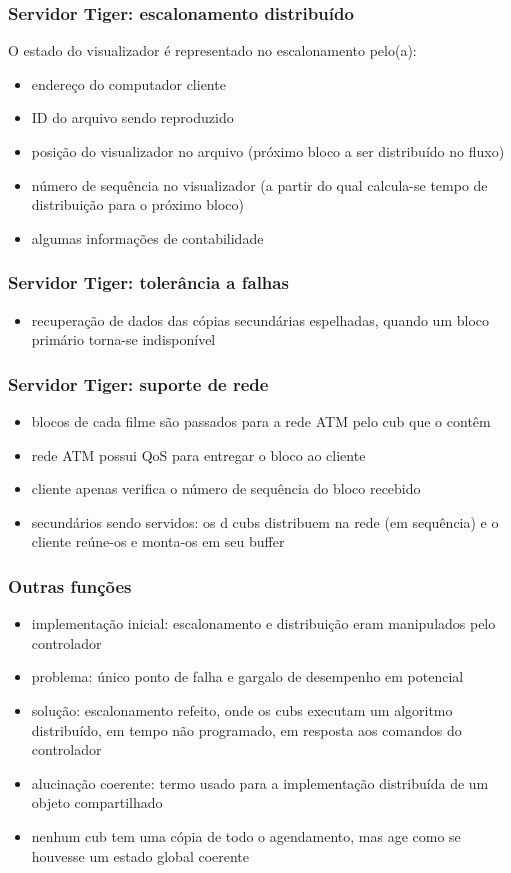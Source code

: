 \documentclass[]{beamer}
\begin{document}
\begin{frame}
 \frametitle{Servidor Tiger: escalonamento distribuído}
O estado do visualizador é representado no escalonamento pelo(a):
 \begin{itemize}
       \item endereço do computador cliente
       \item ID do arquivo sendo reproduzido
       \item posição do visualizador no arquivo (próximo bloco a ser distribuído no fluxo)
       \item número de sequência no visualizador (a partir do qual calcula-se tempo de
distribuição para o próximo bloco)
       \item algumas informações de contabilidade
 \end{itemize}
\end{frame}

\begin{frame}
 \frametitle{Servidor Tiger: tolerância a falhas}
 \begin{itemize}
  \item recuperação de dados das cópias secundárias espelhadas, quando um bloco primário
torna-se indisponível
 \end{itemize}
\end{frame}

\begin{frame}
 \frametitle{Servidor Tiger: suporte de rede}
 \begin{itemize}
  \item blocos de cada filme são passados para a rede ATM pelo cub que o contêm
  \item rede ATM possui QoS para entregar  o bloco ao cliente
  \item cliente apenas verifica o número de sequência do bloco recebido
  \item secundários sendo servidos: os d cubs distribuem na rede (em sequência) e 
o cliente reúne-os e monta-os em seu buffer
 \end{itemize}
\end{frame}

\begin{frame}
 \frametitle{Outras funções}
  \begin{itemize}
   \item implementação inicial: escalonamento e distribuição eram manipulados pelo
controlador
   \item problema: único ponto de falha e gargalo de desempenho em potencial
   \item solução: escalonamento refeito, onde os cubs executam um algoritmo distribuído, 
em tempo não programado, em resposta aos comandos do controlador
   \item alucinação coerente: termo usado para a implementação distribuída de um objeto
compartilhado
   \item nenhum cub tem uma cópia de todo o agendamento, mas age como se houvesse um
estado global coerente
  \end{itemize}
\end{frame}
\end{document}
